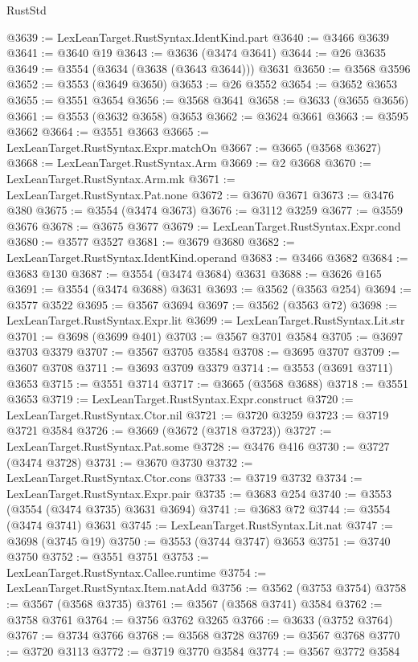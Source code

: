 \begin{lexlean}{RustStd}
\begin{coremodule}
@3639 := LexLeanTarget.RustSyntax.IdentKind.part
@3640 := @3466 @3639
@3641 := @3640 @19
@3643 := @3636 (@3474 @3641)
@3644 := @26 @3635
@3649 := @3554 (@3634 (@3638 (@3643 @3644))) @3631
@3650 := @3568 @3596
@3652 := @3553 (@3649 @3650)
@3653 := @26 @3552
@3654 := @3652 @3653
@3655 := @3551 @3654
@3656 := @3568 @3641
@3658 := @3633 (@3655 @3656)
@3661 := @3553 (@3632 @3658) @3653
@3662 := @3624 @3661
@3663 := @3595 @3662
@3664 := @3551 @3663
@3665 := LexLeanTarget.RustSyntax.Expr.matchOn
@3667 := @3665 (@3568 @3627)
@3668 := LexLeanTarget.RustSyntax.Arm
@3669 := @2 @3668
@3670 := LexLeanTarget.RustSyntax.Arm.mk
@3671 := LexLeanTarget.RustSyntax.Pat.none
@3672 := @3670 @3671
@3673 := @3476 @380
@3675 := @3554 (@3474 @3673)
@3676 := @3112 @3259
@3677 := @3559 @3676
@3678 := @3675 @3677
@3679 := LexLeanTarget.RustSyntax.Expr.cond
@3680 := @3577 @3527
@3681 := @3679 @3680
@3682 := LexLeanTarget.RustSyntax.IdentKind.operand
@3683 := @3466 @3682
@3684 := @3683 @130
@3687 := @3554 (@3474 @3684) @3631
@3688 := @3626 @165
@3691 := @3554 (@3474 @3688) @3631
@3693 := @3562 (@3563 @254)
@3694 := @3577 @3522
@3695 := @3567 @3694
@3697 := @3562 (@3563 @72)
@3698 := LexLeanTarget.RustSyntax.Expr.lit
@3699 := LexLeanTarget.RustSyntax.Lit.str
@3701 := @3698 (@3699 @401)
@3703 := @3567 @3701 @3584
@3705 := @3697 @3703 @3379
@3707 := @3567 @3705 @3584
@3708 := @3695 @3707
@3709 := @3607 @3708
@3711 := @3693 @3709 @3379
@3714 := @3553 (@3691 @3711) @3653
@3715 := @3551 @3714
@3717 := @3665 (@3568 @3688)
@3718 := @3551 @3653
@3719 := LexLeanTarget.RustSyntax.Expr.construct
@3720 := LexLeanTarget.RustSyntax.Ctor.nil
@3721 := @3720 @3259
@3723 := @3719 @3721 @3584
@3726 := @3669 (@3672 (@3718 @3723))
@3727 := LexLeanTarget.RustSyntax.Pat.some
@3728 := @3476 @416
@3730 := @3727 (@3474 @3728)
@3731 := @3670 @3730
@3732 := LexLeanTarget.RustSyntax.Ctor.cons
@3733 := @3719 @3732
@3734 := LexLeanTarget.RustSyntax.Expr.pair
@3735 := @3683 @254
@3740 := @3553 (@3554 (@3474 @3735) @3631 @3694)
@3741 := @3683 @72
@3744 := @3554 (@3474 @3741) @3631
@3745 := LexLeanTarget.RustSyntax.Lit.nat
@3747 := @3698 (@3745 @19)
@3750 := @3553 (@3744 @3747) @3653
@3751 := @3740 @3750
@3752 := @3551 @3751
@3753 := LexLeanTarget.RustSyntax.Callee.runtime
@3754 := LexLeanTarget.RustSyntax.Item.natAdd
@3756 := @3562 (@3753 @3754)
@3758 := @3567 (@3568 @3735)
@3761 := @3567 (@3568 @3741) @3584
@3762 := @3758 @3761
@3764 := @3756 @3762 @3265
@3766 := @3633 (@3752 @3764)
@3767 := @3734 @3766
@3768 := @3568 @3728
@3769 := @3567 @3768
@3770 := @3720 @3113
@3772 := @3719 @3770 @3584
@3774 := @3567 @3772 @3584

\end{coremodule}
\end{lexlean}
